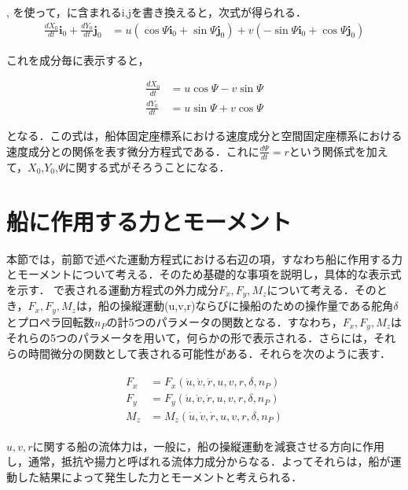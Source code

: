 , を使って，に含まれるi,jを書き換えると，次式が得られる．
\begin{align}
    \frac{d X_{0}}{d t} \boldsymbol{i}_{0}+\frac{d Y_{0}}{d t} \boldsymbol{j}_{0} &=  u (\cos{\Psi} \boldsymbol{i}_0 + \sin{\Psi} \boldsymbol{j}_0) + v (- \sin{\Psi} \boldsymbol{i}_0 + \cos{\Psi} \boldsymbol{j}_0) \label{eq:2-16}
\end{align}

これを成分毎に表示すると，

\begin{align}
    \frac{d X_{0}}{d t} &= u \cos \Psi - v \sin \Psi \label{eq:2-17}\\
    \frac{d Y_{0}}{d t} &= u \sin \Psi + v \cos \Psi \label{eq:2-18}
\end{align}

となる．この式は，船体固定座標系における速度成分と空間固定座標系における速度成分との関係を表す微分方程式である．これに$\frac{d \Psi}{d t}=r$という関係式を加えて，$X_0$,$Y_0$,$\Psi$に関する式がそろうことになる．

\section{船に作用する力とモーメント}

本節では，前節で述べた運動方程式における右辺の項，すなわち船に作用する力とモーメントについて考える．そのため基礎的な事項を説明し，具体的な表示式を示す．
で表される運動方程式の外力成分$F_x,F_y,M_z$について考える．そのとき，$F_x,F_y,M_z$は，船の操縦運動(u,v,r)ならびに操船のための操作量である舵角$\delta$とプロペラ回転数$n_P$の計5つのパラメータの関数となる．すなわち，$F_x,F_y,M_z$はそれらの5つのパラメータを用いて，何らかの形で表示される．さらには，それらの時間微分の関数として表される可能性がある．それらを次のように表す．

\begin{align}
    \begin{split}
        F_{x} &=F_{x}\left(\dot{u}, \dot{v}, \dot{r}, u, v, r, \delta, n_{P}\right) \\
        F_{y} &=F_{y}\left(\dot{u}, \dot{v}, \dot{r}, u, v, r, \delta, n_{P}\right) \\
        M_{z} &=M_{z}\left(\dot{u}, \dot{v}, \dot{r}, u, v, r, \delta, n_{P}\right) \label{eq:2-19}
    \end{split}
\end{align}

$u,v,r$に関する船の流体力は，一般に，船の操縦運動を減衰させる方向に作用し，通常，抵抗や揚力と呼ばれる流体力成分からなる．よってそれらは，船が運動した結果によって発生した力とモーメントと考えられる．

